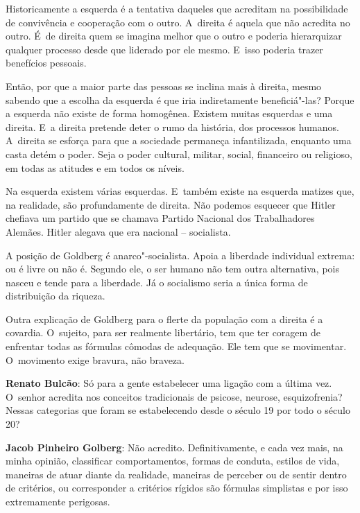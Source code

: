 Historicamente a esquerda é a tentativa daqueles que acreditam na
possibilidade de convivência e cooperação com o outro. A~direita é
aquela que não acredita no outro. É~de direita quem se imagina melhor
que o outro e poderia hierarquizar qualquer processo desde que liderado
por ele mesmo. E~isso poderia trazer benefícios pessoais.

Então, por que a maior parte das pessoas se inclina mais à direita, mesmo
sabendo que a escolha da esquerda é que iria indiretamente
beneficiá"-las? Porque a esquerda não existe de forma homogênea. Existem
muitas esquerdas e uma direita. E~a direita pretende deter o rumo da
história, dos processos humanos. A~direita se esforça para que a
sociedade permaneça infantilizada, enquanto uma casta detém o poder.
Seja o poder cultural, militar, social, financeiro ou religioso, em
todas as atitudes e em todos os níveis.

 
Na esquerda existem várias esquerdas. E~também existe na esquerda
matizes que, na realidade, são profundamente de direita. Não podemos
esquecer que Hitler chefiava um partido que se chamava Partido Nacional
dos Trabalhadores Alemães. Hitler alegava que era nacional --
socialista.

A posição de Goldberg é anarco"-socialista. Apoia a liberdade individual
extrema: ou é livre ou não é. Segundo ele, o ser humano não tem outra
alternativa, pois nasceu e tende para a liberdade. Já o socialismo seria
a única forma de distribuição da riqueza.

Outra explicação de Goldberg para o flerte da população com a direita é
a covardia. O~sujeito, para ser realmente libertário, tem que ter
coragem de enfrentar todas as fórmulas cômodas de adequação. Ele tem que
se movimentar. O~movimento exige bravura, não braveza.

\begin{center}\asterisc{}\end{center}


\abrefala 

\textbf{Renato Bulcão}: Só para a gente estabelecer uma ligação com a
última vez. O~senhor acredita nos conceitos tradicionais de psicose,
neurose, esquizofrenia? Nessas categorias que foram se estabelecendo
desde o século 19 por todo o século 20?

 

\textbf{Jacob Pinheiro Golberg}: Não acredito. Definitivamente, e cada
vez mais, na minha opinião, classificar comportamentos, formas de
conduta, estilos de vida, maneiras de atuar diante da realidade,
maneiras de perceber ou de sentir dentro de critérios, ou corresponder a
critérios rígidos são fórmulas simplistas e por isso extremamente
perigosas.

